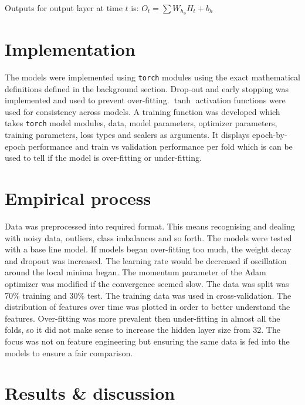 \documentclass[conference]{IEEEtran}
\begin{document}
Outputs for output layer at time $t$ is: $O_{t} = \sum W_{h_o} H_{t} + b_{h}$








\section{Implementation}

The models were implemented using \texttt{torch} modules using the exact mathematical definitions defined in the background section. Drop-out and early stopping was implemented and used to prevent over-fitting. $\tanh$ activation functions were used for consistency across models. A training function was developed which takes \texttt{torch} model modules, data, model parameters, optimizer parameters, training parameters, loss types and scalers as arguments. It displays epoch-by-epoch performance and train vs validation performance per fold which is can be used to tell if the model is over-fitting or under-fitting.



\section{Empirical process}

Data was preprocessed into required format. This means recognising and dealing with noisy data, outliers, class imbalances and so forth. The models were tested with a base line model. If models began over-fitting too much, the weight decay and dropout was increased. The learning rate would be decreased if oscillation around the local minima began. The momentum parameter of the Adam optimizer was modified if the convergence seemed slow. The data was split was 70\% training and 30\% test. The training data was used in cross-validation. The distribution of features over time was plotted in order to better understand the features. Over-fitting was more prevalent then under-fitting in almost all the folds, so it did not make sense to increase the hidden layer size from 32. The focus was not on feature engineering but ensuring the same data is fed into the models to ensure a fair comparison.

\section{Results \& discussion}
\end{document}
